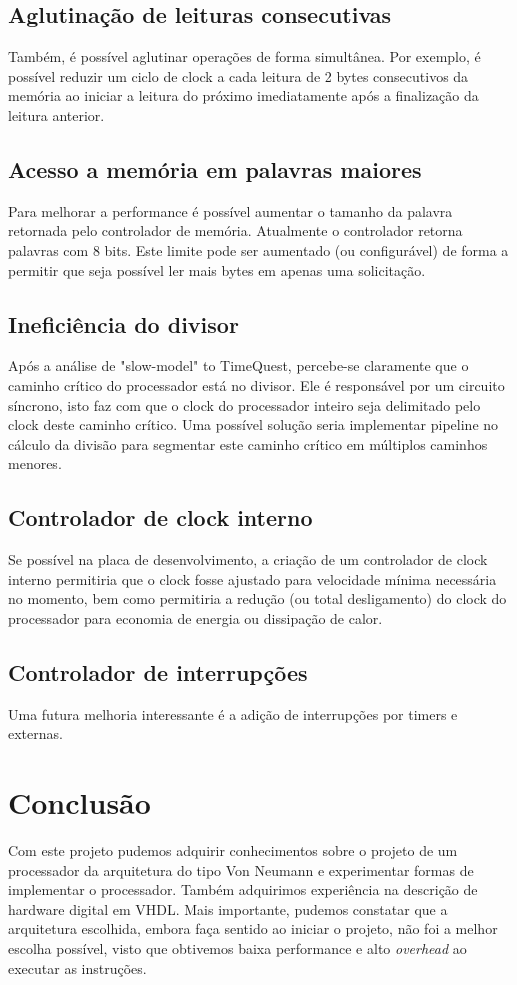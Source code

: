 \documentclass[11pt]{report}
\begin{document}
\section*{Aglutinação de leituras consecutivas}
Também, é possível aglutinar operações de forma simultânea. Por exemplo, é possível reduzir um ciclo de clock a cada leitura de 2 bytes consecutivos da memória ao iniciar a leitura do próximo imediatamente após a finalização da leitura anterior.

\section*{Acesso a memória em palavras maiores}
Para melhorar a performance é possível aumentar o tamanho da palavra retornada pelo controlador de memória. Atualmente o controlador retorna palavras com 8 bits. Este limite pode ser aumentado (ou configurável) de forma a permitir que seja possível ler mais bytes em apenas uma solicitação.

\section*{Ineficiência do divisor}
Após a análise de "slow-model" to TimeQuest, percebe-se claramente que o caminho crítico do processador está no divisor. Ele é responsável por um circuito síncrono, isto faz com que o clock do processador inteiro seja delimitado pelo clock deste caminho crítico. Uma possível solução seria implementar pipeline no cálculo da divisão para segmentar este caminho crítico em múltiplos caminhos menores.

\section*{Controlador de clock interno}
Se possível na placa de desenvolvimento, a criação de um controlador de clock interno permitiria que o clock fosse ajustado para velocidade mínima necessária no momento, bem como permitiria a redução (ou total desligamento) do clock do processador para economia de energia ou dissipação de calor.

\section*{Controlador de interrupções}
Uma futura melhoria interessante é a adição de interrupções por timers e externas.

\chapter{Conclusão}
Com este projeto pudemos adquirir conhecimentos sobre o projeto de um processador da arquitetura do tipo Von Neumann e experimentar formas de implementar o processador. Também adquirimos experiência na descrição de hardware digital em VHDL. Mais importante, pudemos constatar que a arquitetura escolhida, embora faça sentido ao iniciar o projeto, não foi a melhor escolha possível, visto que obtivemos baixa performance e alto \emph{overhead} ao executar as instruções.
\end{document}
